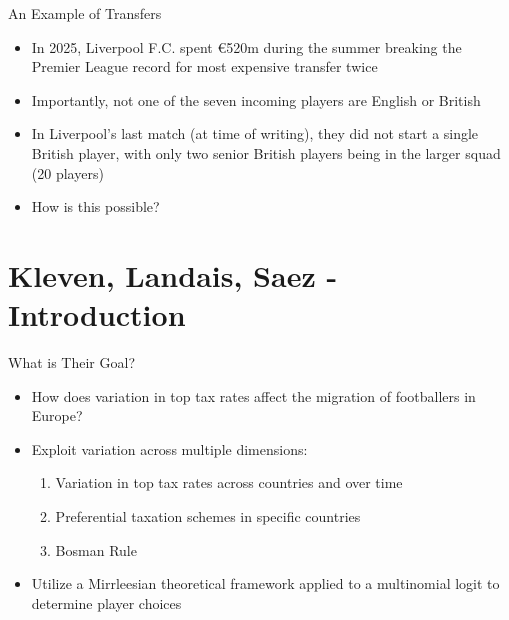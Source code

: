 \documentclass[aspectratio=169,professionalfonts]{beamer}
\begin{document}
\begin{frame}{An Example of Transfers}
  \begin{itemize}
    \item In 2025, Liverpool F.C. spent \euro 520m during the summer breaking the Premier League record for most expensive transfer twice
    \item Importantly, not one of the seven incoming players are English or British
    \item In Liverpool's last match (at time of writing), they did not start a single British player, with only two senior British players being in the larger squad (20 players)
    \item How is this possible?
  \end{itemize}
\end{frame}

\section{Kleven, Landais, Saez - Introduction}

\begin{frame}{What is Their Goal?}
  \begin{itemize}
    \item How does variation in top tax rates affect the migration of footballers in Europe?
    \item Exploit variation across multiple dimensions:
    \begin{enumerate}
      \item Variation in top tax rates across countries and over time
      \item Preferential taxation schemes in specific countries
      \item Bosman Rule
    \end{enumerate}
    \item Utilize a Mirrleesian theoretical framework applied to a multinomial logit to determine player choices
  \end{itemize}
\end{frame}
\end{document}
